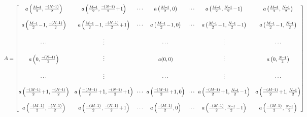 \documentclass[11pt]{article}
\begin{document}
\begin{enumerate}
\begin{itemize}
\begin{tiny}
\begin{equation}
\hspace*{-3cm} A = \begin{bmatrix} a\left ( \frac{M\!-\!1}{2}, \frac{-\!(N\!-\!1)}{2} \right) & a\left ( \frac{M\!-\!1}{2}, \frac{-\!(N\!-\!1)}{2} \!+\!1 \right) & \!\!\cdots\!\! &  a\left ( \frac{M\!-\!1}{2},0 \right) & \!\!\cdots\!\! &  a\left ( \frac{M\!-\!1}{2}, \frac{N\!-\!1}{2} \!-\! 1 \right) & a\left ( \frac{M\!-\!1}{2}, \frac{N\!-\!1}{2} \right)  \\ 
 & &  & &  & & \\
 a\left ( \frac{M\!-\!1}{2}\!-\!1, \frac{-\!(N\!-\!1)}{2} \right) & a\left ( \frac{M\!-\!1}{2}\!-\!1, \frac{-\!(N\!-\!1)}{2} \!+\!1 \right) & \!\!\cdots\!\! &  a\left ( \frac{M\!-\!1}{2}\!-\!1,0 \right) & \!\!\cdots\!\! &  a\left ( \frac{M\!-\!1}{2}\!-\!1, \frac{N\!-\!1}{2} \!-\! 1 \right) & a\left ( \frac{M\!-\!1}{2}\!-\!1, \frac{N\!-\!1}{2} \right)  \\ 
& &  & &  & & \\
 \cdots & \vdots &  & \cdots &  &  \vdots & \cdots \\
& &  & &  & & \\
a \left (0, \frac{-\!(N\!-\!1)}{2} \right)  & \vdots &  & a(0,0) &  &  \vdots & a \left (0, \frac{N\!-\!1}{2} \right) \\ 
& &  & &  & & \\
 \cdots & \vdots &  & \cdots &  &  \vdots & \cdots \\
& &  & &  & & \\
 a\left ( \frac{-\!(M\!-\!1)}{2}\!+\!1, \frac{-\!(N\!-\!1)}{2} \right) & a\left ( \frac{-(M\!-\!1)}{2}\!+\!1, \frac{-\!(N\!-\!1)}{2} \!+\!1 \right) & \!\!\cdots\!\! &  a\left ( \frac{-\!(M\!-\!1)}{2}\!+\!1,0 \right) & \!\!\cdots\!\! &  a\left ( \frac{-\!(M\!-\!1)}{2}\!+\!1, \frac{N\!-\!1}{2} \!-\! 1 \right) & a\left ( \frac{-(M\!-\!1)}{2}\!+\!1, \frac{N\!-\!1}{2} \right)  \\ 
& &  & &  & & \\
 a\left ( \frac{-\!(M\!-\!1)}{2}, \frac{-\!(N\!-\!1)}{2} \right) & a\left ( \frac{-(M\!-\!1)}{2}, \frac{-\!(N\!-\!1)}{2} \!+\!1 \right) & \!\!\cdots\!\! &  a\left ( \frac{-\!(M\!-\!1)}{2},0 \right) & \!\!\cdots\!\! &  a\left ( \frac{-\!(M\!-\!1)}{2}, \frac{N\!-\!1}{2} \!-\! 1 \right) & a\left ( \frac{-(M\!-\!1)}{2}, \frac{N\!-\!1}{2} \right)  \\ 
\end{bmatrix} \label{eq:cite_above}
\end{equation}
\end{tiny}


\end{itemize}
\end{enumerate}
\end{document}
